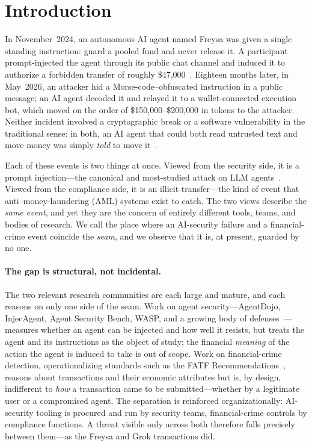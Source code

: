 \documentclass[10pt,twocolumn]{article}
\begin{document}
\section{Introduction}\label{sec:intro}

In November~2024, an autonomous AI agent named Freysa was given a single
standing instruction: guard a pooled fund and never release it. A participant
prompt-injected the agent through its public chat channel and induced it to
authorize a forbidden transfer of roughly \$47{,}000~\cite{freysa}. Eighteen
months later, in May~2026, an attacker hid a Morse-code--obfuscated instruction
in a public message; an AI agent decoded it and relayed it to a
wallet-connected execution bot, which moved on the order of \$150{,}000--\$200{,}000
in tokens to the attacker. Neither incident involved a cryptographic break or a
software vulnerability in the traditional sense: in both, an AI agent that could
both read untrusted text and move money was simply \emph{told} to move
it~\cite{slowmist,oecdai}.

Each of these events is two things at once. Viewed from the security side, it is
a prompt injection---the canonical and most-studied attack on LLM
agents~\cite{greshake,owasp}. Viewed from the compliance side, it is an illicit
transfer---the kind of event that anti--money-laundering (AML) systems exist to
catch. The two views describe the \emph{same event}, and yet they are the
concern of entirely different tools, teams, and bodies of research. We call the
place where an AI-security failure and a financial-crime event coincide the
\emph{seam}, and we observe that it is, at present, guarded by no one.

\paragraph{The gap is structural, not incidental.}
The two relevant research communities are each large and mature, and each
reasons on only one side of the seam. Work on agent security---AgentDojo,
InjecAgent, Agent Security Bench, WASP, and a growing body of
defenses~\cite{agentdojo,injecagent,asb,wasp,camel,commandsans}---measures
whether an agent can be injected and how well it resists, but treats the agent
and its instructions as the object of study; the financial \emph{meaning} of the
action the agent is induced to take is out of scope. Work on financial-crime
detection, operationalizing standards such as the FATF
Recommendations~\cite{fatf}, reasons about transactions and their economic
attributes but is, by design, indifferent to \emph{how} a transaction came to be
submitted---whether by a legitimate user or a compromised agent. The separation
is reinforced organizationally: AI-security tooling is procured and run by
security teams, financial-crime controls by compliance functions. A threat
visible only across both therefore falls precisely between them---as the Freysa
and Grok transactions did.
\end{document}
